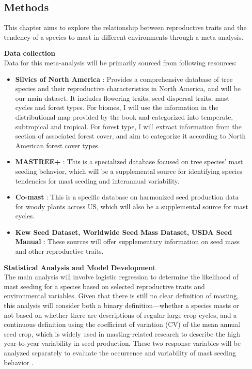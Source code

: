 \documentclass[11pt,letter]{article}
\begin{document}
\subsection{Methods}
This chapter aims to explore the relationship between reproductive traits and the tendency of a species to mast in different environments through a meta-analysis.

\textbf{Data collection}\\
Data for this meta-analysis will be primarily sourced from following resources:
	\begin{itemize}
	\item \textbf{Silvics of North America} \citep{burns1990silvics}: Provides a comprehensive database of tree species and their reproductive characteristics in North America, and will be our main dataset. It includes flowering traits, seed dispersal traits, mast cycles and forest types. For biomes, I will use the information in the distributional map provided by the book and categorized into temperate, subtropical and tropical. For forest type, I will extract information from the section of associated forest cover, and aim to categorize it according to North American forest cover types.
	\item \textbf{MASTREE+} \citep{hacket2022mastree+}: This is a specialized database focused on tree species' mast seeding behavior, which will be a supplemental source for identifying species tendencies for mast seeding and interannual variability.
	\item \textbf{Co-mast} \citep{nigro2025co}: This is a specific database on harmonized seed production data for woody plants across US, which will also be a supplemental source for mast cycles.
	\item \textbf{Kew Seed Dataset, Worldwide Seed Mass Dataset, USDA Seed Manual} \citep{bonner2008woody, KewSeedDatabase, Moles2015SeedMass}: These sources will offer supplementary information on seed mass and other reproductive traits.
	\end{itemize}
\textbf{Statistical Analysis and Model Development}\\
The main analysis will involve logistic regression to determine the likelihood of mast seeding for a species based on selected reproductive traits and environmental variables. Given that there is still no clear definition of masting, this analysis will consider both a binary definition---whether a species masts or not based on whether there are descriptions of regular large crop cycles, and a continuous definition using the coefficient of variation (CV) of the mean annual seed crop, which is widely used in masting-related research to describe the high year-to-year variability in seed production. These two response variables will be analyzed separately to evaluate the occurrence and variability of mast seeding behavior \citep{kelly2002mast}.
\end{document}
